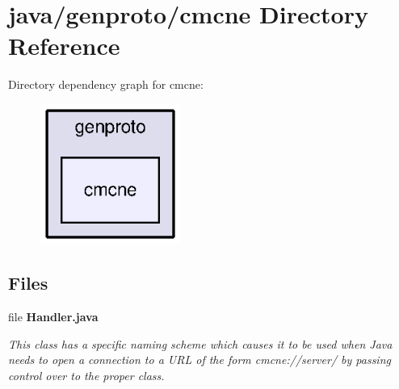 \section{java/genproto/cmcne Directory Reference}
\label{dir_1daa675e43872d4aa9c16b7c1351d540}
Directory dependency graph for cmcne\+:
\nopagebreak
\begin{figure}[H]
\begin{center}
\leavevmode
\includegraphics[width=130pt]{dir_1daa675e43872d4aa9c16b7c1351d540_dep}
\end{center}
\end{figure}
\subsection*{Files}
\begin{DoxyCompactItemize}
\item 
file {\bf Handler.\+java}
\begin{DoxyCompactList}\small\item\em This class has a specific naming scheme which causes it to be used when Java needs to open a connection to a U\+R\+L of the form cmcne\+://server/ by passing control over to the proper class. \end{DoxyCompactList}\end{DoxyCompactItemize}
